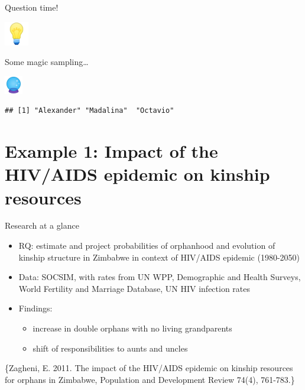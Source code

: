 \documentclass[
  ignorenonframetext,
]{beamer}
\providecommand{\tightlist}{%
  \setlength{\itemsep}{0pt}\setlength{\parskip}{0pt}}
\begin{document}
\begin{frame}{Question time!}
\protect\hypertarget{question-time}{}

\includegraphics[width=0.41667in,height=\textheight]{resources/light.png}

\end{frame}

\begin{frame}[fragile]{Some magic sampling\ldots{}}
\protect\hypertarget{some-magic-sampling}{}

\includegraphics[width=0.3125in,height=\textheight]{resources/ball.png}

\begin{verbatim}
## [1] "Alexander" "Madalina"  "Octavio"
\end{verbatim}

\end{frame}

\hypertarget{example-1-impact-of-the-hivaids-epidemic-on-kinship-resources}{%
\section{Example 1: Impact of the HIV/AIDS epidemic on kinship
resources}\label{example-1-impact-of-the-hivaids-epidemic-on-kinship-resources}}

\begin{frame}{Research at a glance}
\protect\hypertarget{research-at-a-glance}{}

\begin{itemize}
\tightlist
\item
  RQ: estimate and project probabilities of orphanhood and evolution of
  kinship structure in Zimbabwe in context of HIV/AIDS epidemic
  (1980-2050)
\item
  Data: SOCSIM, with rates from UN WPP, Demographic and Health Surveys,
  World Fertility and Marriage Database, UN HIV infection rates
\item
  Findings:

  \begin{itemize}
  \tightlist
  \item
    increase in double orphans with no living grandparents
  \item
    shift of responsibilities to aunts and uncles
  \end{itemize}
\end{itemize}

\tiny\{Zagheni, E. 2011. The impact of the HIV/AIDS epidemic on kinship
resources for orphans in Zimbabwe, Population and Development Review
74(4), 761-783.\}

\end{frame}
\end{document}
